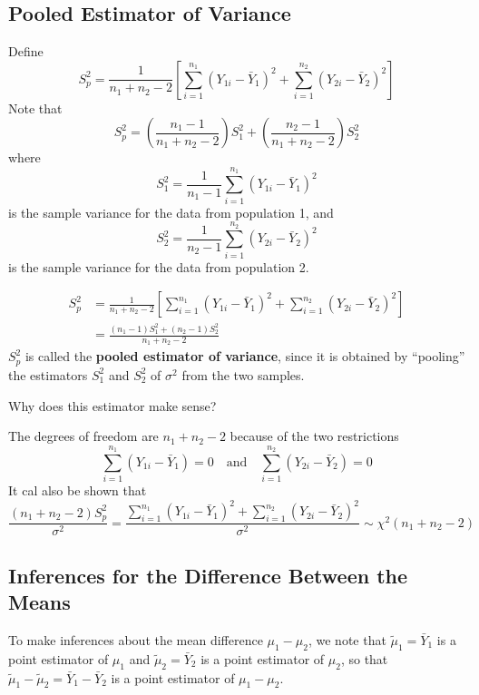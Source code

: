 \subsection{Pooled Estimator of Variance}
Define
\[S_{p}^{2}=\frac{1}{n_{1}+n_{2}-2}\left[\sum_{i=1}^{n_{1}}\left(Y_{1 i}-\bar{Y}_{1}\right)^{2}+\sum_{i=1}^{n_{2}}\left(Y_{2 i}-\bar{Y}_{2}\right)^{2}\right]\]
Note that
\[S_{p}^{2}=\left(\frac{n_{1}-1}{n_{1}+n_{2}-2}\right) S_{1}^{2}+\left(\frac{n_{2}-1}{n_{1}+n_{2}-2}\right) S_{2}^{2}\]
where
\[S_{1}^{2}=\frac{1}{n_{1}-1} \sum_{i=1}^{n_{1}}\left(Y_{1 i}-\bar{Y}_{1}\right)^{2}\]
is the sample variance for the data from population 1, and
\[S_{2}^{2}=\frac{1}{n_{2}-1} \sum_{i=1}^{n_{2}}\left(Y_{2 i}-\bar{Y}_{2}\right)^{2}\]
is the sample variance for the data from population 2.
\begin{defbox}
    \begin{definition}
        \[\begin{aligned}
                S_{p}^{2} & =\frac{1}{n_{1}+n_{2}-2}\left[\sum_{i=1}^{n_{1}}\left(Y_{1 i}-\bar{Y}_{1}\right)^{2}+\sum_{i=1}^{n_{2}}\left(Y_{2 i}-\bar{Y}_{2}\right)^{2}\right] \\
                          & =\frac{\left(n_{1}-1\right) S_{1}^{2}+\left(n_{2}-1\right) S_{2}^{2}}{n_{1}+n_{2}-2}
            \end{aligned}\]
        $ S_p^2 $ is called the \textbf{pooled estimator of variance}, since it is obtained by
        ``pooling'' the estimators $ S_1^2 $ and $ S_2^2 $ of $ \sigma^2 $ from the two samples.
    \end{definition}
\end{defbox}
Why does this estimator make sense?

The degrees of freedom are $ n_1+n_2-2 $ because of the two restrictions
\[\sum_{i=1}^{n_{1}}\left(Y_{1 i}-\bar{Y}_{1}\right)=0 \quad \text{and} \quad \sum_{i=1}^{n_{2}}\left(Y_{2 i}-\bar{Y}_{2}\right)=0\]
It cal also be shown that
\[\frac{\left(n_{1}+n_{2}-2\right) S_{p}^{2}}{\sigma^{2}}=\frac{\sum_{i=1}^{n_{1}}\left(Y_{1 i}-\bar{Y}_{1}\right)^{2}+\sum_{i=1}^{n_{2}}
    \left(Y_{2 i}-\bar{Y}_{2}\right)^{2}}{\sigma^{2}} \sim \chi^{2}\left(n_{1}+n_{2}-2\right)\]


\subsection{Inferences for the Difference Between the Means}
To make inferences about the mean difference $ \mu_1-\mu_2 $,
we note that $ \tilde{\mu}_1=\bar{Y}_1 $ is a point estimator of $ \mu_1 $ and
$ \tilde{\mu}_2=\bar{Y}_2 $ is a point estimator of $ \mu_2 $, so that $ \tilde{\mu}_1-
    \tilde{\mu}_2=\bar{Y}_1-\bar{Y}_2 $ is a point estimator of $ \mu_1-\mu_2 $.

